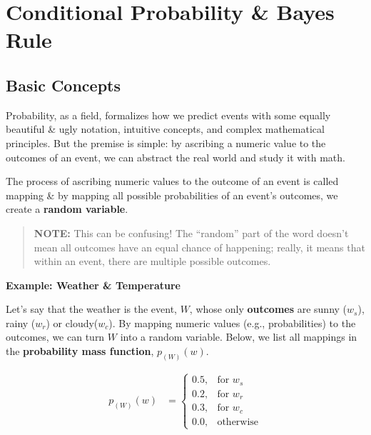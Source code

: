 \documentclass[
]{book}
\begin{document}
\hypertarget{conditional-probability-bayes-rule}{%
\section{Conditional Probability \& Bayes Rule}\label{conditional-probability-bayes-rule}}

\hypertarget{basic-concepts}{%
\subsection*{Basic Concepts}\label{basic-concepts}}

Probability, as a field, formalizes how we predict events with some equally beautiful \& ugly notation, intuitive concepts, and complex mathematical principles. But the premise is simple: by ascribing a numeric value to the outcomes of an event, we can abstract the real world and study it with math.

The process of ascribing numeric values to the outcome of an event is called mapping \& by mapping all possible probabilities of an event's outcomes, we create a \textbf{random variable}.

\begin{quote}
\textbf{NOTE:} This can be confusing! The ``random'' part of the word doesn't mean all outcomes have an equal chance of happening; really, it means that within an event, there are multiple possible outcomes.
\end{quote}

\hfill\break

\textbf{Example: Weather \& Temperature}

Let's say that the weather is the event, \(W\), whose only \textbf{outcomes} are sunny (\(w_s\)), rainy (\(w_r\)) or cloudy(\(w_c\)).
By mapping numeric values (e.g., probabilities) to the outcomes, we can turn \(W\) into a random variable. Below, we list all mappings in the \textbf{probability mass function}, \(p_{(W)}(w)\).

\begin{align*} 
p_{(W)}(w)  &= \begin{cases}
    0.5, & \text{for } w_s \\
    0.2, & \text{for } w_r \\
    0.3, & \text{for } w_c \\
    0.0, & \text{otherwise}
\end{cases}
\end{align*}
\end{document}
